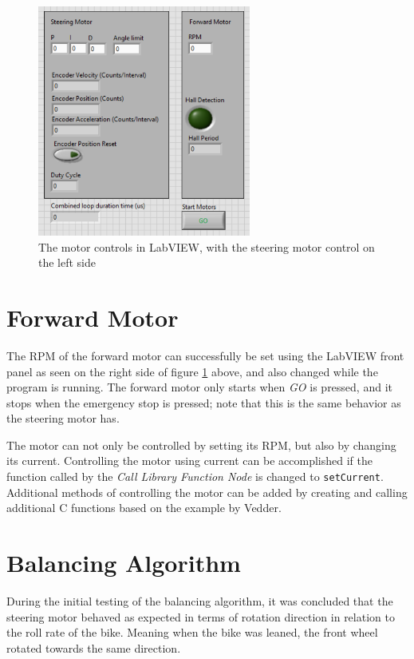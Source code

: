 \begin{figure}[ht]
    \centering
    \includegraphics[width=7cm]{figure/motor_control.png}
    \caption{The motor controls in LabVIEW, with the steering motor control on the left side}
    \label{fig:motorControl}
\end{figure}

\section{Forward Motor}

The RPM of the forward motor can successfully be set using the LabVIEW front panel as seen on the right side of figure \ref{fig:motorControl} above, and also changed while the program is running. The forward motor only starts when \textit{GO} is pressed, and it stops when the emergency stop is pressed; note that this is the same behavior as the steering motor has. 

The motor can not only be controlled by setting its RPM, but also by changing its current. Controlling the motor using current can be accomplished if the function called by the \textit{Call Library Function Node} is changed to \texttt{setCurrent}. Additional methods of controlling the motor can be added by creating and calling additional C functions based on the example by Vedder.

\section{Balancing Algorithm} \label{results:balancing}

During the initial testing of the balancing algorithm, it was concluded that the steering motor behaved as expected in terms of rotation direction in relation to the roll rate of the bike. Meaning when the bike was leaned, the front wheel rotated towards the same direction. 

